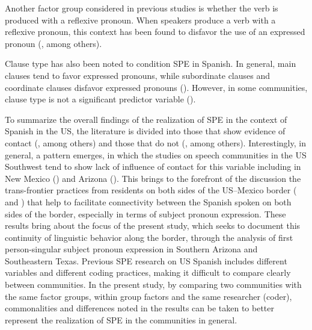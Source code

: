 \documentclass[output=paper]{langscibook}
\begin{document}
Another factor group considered in previous studies is whether the verb is produced with a reflexive pronoun. When speakers produce a verb with a reflexive pronoun, this context has been found to disfavor the use of an expressed pronoun (\citealt{OtheguyLivert2007, Abreu2009, OtheguyZentella2012, Cerrón-Palomino2016}, among others). 



Clause type has also been noted to condition SPE in Spanish. In general, main clauses tend to favor expressed pronouns, while subordinate clauses and coordinate clauses disfavor expressed pronouns (\citealt{Flores-Ferrán2009, OtheguyZentella2012, ShinMontes-Alcalá2014}). However, in some communities, clause type is not a significant predictor variable (\citealt{TorresCacoullosTravis2010a}).



To summarize the overall findings of the realization of SPE in the context of Spanish in the US, the literature is divided into those that show evidence of contact (\citealt{Silva-Corvalán1994, LapidusOtheguy2005, OtheguyLivert2007, OtheguyZentella2012, Limerick2017}, among others) and those that do not (\citealt{Hurtado2001, Flores-Ferrán2004, TorresCacoullosTravis2010b, TorresCacoullosTravis2010a, Cerrón-Palomino2016, Bessett2018}, among others). Interestingly, in general, a pattern emerges, in which the studies on speech communities in the US Southwest tend to show lack of influence of contact for this variable including in New Mexico (\citealt{TorresCacoullosTravis2010b, TorresCacoullosTravis2010a}) and Arizona (\citealt{Cerrón-Palomino2016, Bessett2018}). This brings to the forefront of the discussion the trans-frontier practices from residents on both sides of the US–Mexico border (\citealt{Jaramillo1995, Bessett2015} and \citealt{Cerrón-Palomino2016}) that help to facilitate connectivity between the Spanish spoken on both sides of the border, especially in terms of subject pronoun expression. These results bring about the focus of the present study, which seeks to document this continuity of linguistic behavior along the border, through the analysis of first person-singular subject pronoun expression in Southern Arizona and Southeastern Texas. Previous SPE research on US Spanish includes different variables and different coding practices, making it difficult to compare clearly between communities. In the present study, by comparing two communities with the same factor groups, within group factors and the same researcher (coder), commonalities and differences noted in the results can be taken to better represent the realization of SPE in the communities in general.
\end{document}
